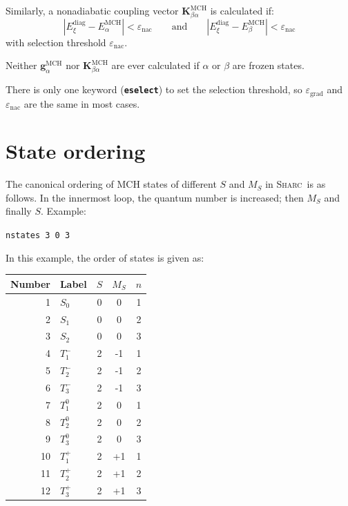 \documentclass[a4paper,10pt,DIV=15,openany,twoside=false]{scrbook}
\newcommand{\sharc}{\textsc{Sharc}}
\newcommand{\ttt}[1]{\textbf{\texttt{#1}}}
\newcommand{\VEC}[1]{\ensuremath{\mathbf{#1}}}
\newenvironment{example}{
  \setlength{\OuterFrameSep}{3pt}
  \vspace{0mm}
  \definecolor{shadecolor}{HTML}{E4F4FF}
  \begin{shaded}
}{
  \end{shaded}
}
\begin{document}
Similarly, a nonadiabatic coupling vector $\VEC{K}^{\text{MCH}}_{\beta\alpha}$ is calculated if:
\begin{equation}
  \left|
    E^{\text{diag}}_\xi - E^{\text{MCH}}_\alpha
  \right|
  <
  \varepsilon_\text{nac}
  \qquad\text{and}\qquad
  \left|
    E^{\text{diag}}_\xi - E^{\text{MCH}}_\beta
  \right|
  <
  \varepsilon_\text{nac}
\end{equation}
with selection threshold $\varepsilon_\text{nac}$.

Neither $\VEC{g}^{\text{MCH}}_\alpha$ nor $\VEC{K}^{\text{MCH}}_{\beta\alpha}$ are ever calculated if $\alpha$ or $\beta$ are frozen states.

There is only one keyword (\ttt{eselect}) to set the selection threshold, so $\varepsilon_\text{grad}$ and $\varepsilon_\text{nac}$ are the same in most cases. 


\section{State ordering}\label{met:ordering}

The canonical ordering of MCH states of different $S$ and $M_S$ in \sharc\ is as follows. In the innermost loop, the quantum number is increased; then $M_S$ and finally $S$. Example:

\begin{example}
  \verb|nstates 3 0 3|
\end{example}

In this example, the order of states is given as:

\begin{tabular}{rlccc}
  \toprule
  Number      &Label       &$S$ &$M_S$  &$n$\\
  \midrule
  1&$S_0$       &0&0&1\\
  2&$S_1$       &0&0&2\\
  3&$S_2$       &0&0&3\\
  4&$T_1^-$       &2&-1&1\\
  5&$T_2^-$       &2&-1&2\\
  6&$T_3^-$       &2&-1&3\\
  7&$T_1^0$       &2&0&1\\
  8&$T_2^0$       &2&0&2\\
  9&$T_3^0$       &2&0&3\\
  10&$T_1^+$       &2&+1&1\\
  11&$T_2^+$       &2&+1&2\\
  12&$T_3^+$       &2&+1&3\\
  \bottomrule
\end{tabular}
\end{document}
